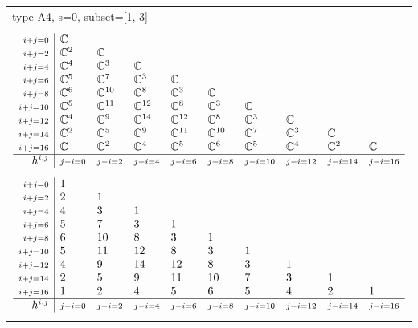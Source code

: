 \documentclass[crop,border=2mm]{standalone}
\begin{document}
\begin{tabular}{l}
{\huge type A4, s=0, subset=[1, 3]}\\ \\


$\displaystyle
\begin{array}{r|l l l l l l l l l}
	{\scriptstyle i+j=0}&\mathbb{C}&&&&&&&&\\
	{\scriptstyle i+j=2}&\mathbb{C}^{2}&\mathbb{C}&&&&&&&\\
	{\scriptstyle i+j=4}&\mathbb{C}^{4}&\mathbb{C}^{3}&\mathbb{C}&&&&&&\\
	{\scriptstyle i+j=6}&\mathbb{C}^{5}&\mathbb{C}^{7}&\mathbb{C}^{3}&\mathbb{C}&&&&&\\
	{\scriptstyle i+j=8}&\mathbb{C}^{6}&\mathbb{C}^{10}&\mathbb{C}^{8}&\mathbb{C}^{3}&\mathbb{C}&&&&\\
	{\scriptstyle i+j=10}&\mathbb{C}^{5}&\mathbb{C}^{11}&\mathbb{C}^{12}&\mathbb{C}^{8}&\mathbb{C}^{3}&\mathbb{C}&&&\\
	{\scriptstyle i+j=12}&\mathbb{C}^{4}&\mathbb{C}^{9}&\mathbb{C}^{14}&\mathbb{C}^{12}&\mathbb{C}^{8}&\mathbb{C}^{3}&\mathbb{C}&&\\
	{\scriptstyle i+j=14}&\mathbb{C}^{2}&\mathbb{C}^{5}&\mathbb{C}^{9}&\mathbb{C}^{11}&\mathbb{C}^{10}&\mathbb{C}^{7}&\mathbb{C}^{3}&\mathbb{C}&\\
	{\scriptstyle i+j=16}&\mathbb{C}&\mathbb{C}^{2}&\mathbb{C}^{4}&\mathbb{C}^{5}&\mathbb{C}^{6}&\mathbb{C}^{5}&\mathbb{C}^{4}&\mathbb{C}^{2}&\mathbb{C}\\
	\hline h^{i,j}&{\scriptstyle j-i=0}&{\scriptstyle j-i=2}&{\scriptstyle j-i=4}&{\scriptstyle j-i=6}&{\scriptstyle j-i=8}&{\scriptstyle j-i=10}&{\scriptstyle j-i=12}&{\scriptstyle j-i=14}&{\scriptstyle j-i=16}
\end{array}
$ \\ \\


$\displaystyle
\begin{array}{r|l l l l l l l l l}
	{\scriptstyle i+j=0}&1&&&&&&&&\\
	{\scriptstyle i+j=2}&2&1&&&&&&&\\
	{\scriptstyle i+j=4}&4&3&1&&&&&&\\
	{\scriptstyle i+j=6}&5&7&3&1&&&&&\\
	{\scriptstyle i+j=8}&6&10&8&3&1&&&&\\
	{\scriptstyle i+j=10}&5&11&12&8&3&1&&&\\
	{\scriptstyle i+j=12}&4&9&14&12&8&3&1&&\\
	{\scriptstyle i+j=14}&2&5&9&11&10&7&3&1&\\
	{\scriptstyle i+j=16}&1&2&4&5&6&5&4&2&1\\
	\hline h^{i,j}&{\scriptstyle j-i=0}&{\scriptstyle j-i=2}&{\scriptstyle j-i=4}&{\scriptstyle j-i=6}&{\scriptstyle j-i=8}&{\scriptstyle j-i=10}&{\scriptstyle j-i=12}&{\scriptstyle j-i=14}&{\scriptstyle j-i=16}
\end{array}
$ \\ \\



\end{tabular}
\end{document}
